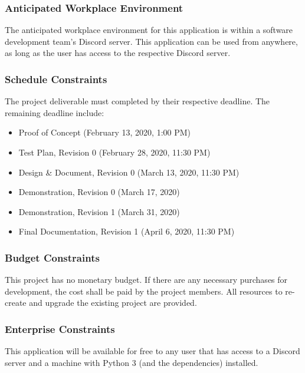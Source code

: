\documentclass[12pt, titlepage]{article}
\begin{document}
\subsubsection{Anticipated Workplace Environment}
The anticipated workplace environment for this application is within a software development team's Discord server. This application can be used from anywhere, as long as the user has access to the respective Discord server.

\subsubsection{Schedule Constraints}
The project deliverable must completed by their respective deadline. The remaining deadline include:
\begin{itemize}
    \item Proof of Concept (February 13, 2020, 1:00 PM)
    \item Test Plan, Revision 0 (February 28, 2020, 11:30 PM)
    \item Design \& Document, Revision 0 (March 13, 2020, 11:30 PM)
    \item Demonstration, Revision 0 (March 17, 2020)
    \item Demonstration, Revision 1 (March 31, 2020)
    \item Final Documentation, Revision 1 (April 6, 2020, 11:30 PM)
\end{itemize}

\subsubsection{Budget Constraints}
This project has no monetary budget. If there are any necessary purchases for development, the cost shall be paid by the project members. All resources to re-create and upgrade the existing project are provided.

\subsubsection{Enterprise Constraints}
This application will be available for free to any user that has access to a Discord server and a machine with Python 3 (and the dependencies) installed.
\end{document}
